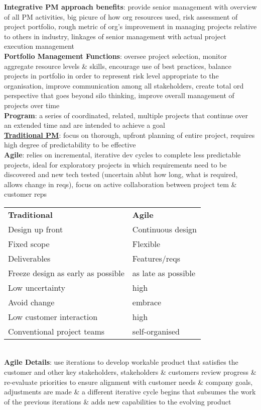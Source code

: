 \documentclass[a4paper]{article}
\begin{document}
\begin{multicols}{2}
        \textbf{Integrative PM approach benefits}: provide senior management with overview of all PM activities, big picure of how org resources used, risk assessment of project portfolio, rough metric of org's improvement in managing projects relative to others in industry, linkages of senior management with actual project execution management\\
        \textbf{Portfolio Management Functions}: oversee project selection, monitor aggregate resource levels \& skills, encourage use of best practices, balance projects in portfolio in order to represent risk level appropriate to the organisation, improve communication among all stakeholders, create total ord perspective that goes beyond silo thinking, improve overall management of projects over time\\
        \textbf{Program}: a series of coordinated, related, multiple projects that continue over an extended time and are intended to achieve a goal\\
        \underline{\textbf{Traditional PM}}: focus on thorough, upfront planning of entire project, requires high degree of predictability to be effective\\
        \textbf{Agile}: relies on incremental, iterative dev cycles to complete less predictable projects, ideal for exploratory projects in which requirements need to be discovered and new tech tested (uncertain ablut how long, what is required, allows change in reqs), focus on active collaboration between project tem \& customer reps\\
        \begin{tabular}{l l}
            \textbf{Traditional} & \textbf{Agile}\\
            Design up front & Continuous design\\
            Fixed scope & Flexible\\
            Deliverables & Features/reqs\\
            Freeze design as early as possible & as late as possible\\
            Low uncertainty & high\\
            Avoid change & embrace\\
            Low customer interaction & high\\
            Conventional project teams & self-organised\\
        \end{tabular}\\
        \textbf{Agile Details}: use iterations to develop workable product that satisfies the customer and other key stakeholders, stakeholders \& customers review progress \& re-evaluate priorities to ensure alignment with customer needs \& company goals, adjustments are made \& a different iterative cycle begins that subsumes the work of the previous iterations \& adds new capabilities to the evolving product\\

\end{multicols}
\end{document}
